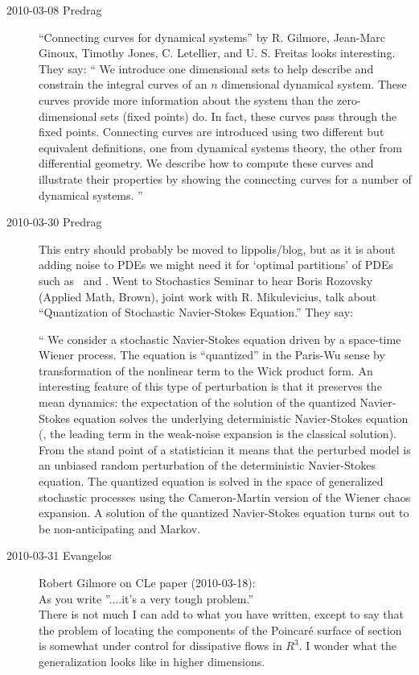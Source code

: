 \begin{description}
\item[2010-03-08 Predrag]
``Connecting curves for dynamical systems'' by
R. Gilmore, Jean-Marc Ginoux, Timothy Jones, C. Letellier, and U. S.
 Freitas looks interesting. They say:
``
 We introduce one dimensional sets to help describe and constrain the integral
curves of an $n$ dimensional dynamical system. These curves provide more
information about the system than the zero-dimensional sets (fixed points) do.
In fact, these curves pass through the fixed points. Connecting curves are
introduced using two different but equivalent definitions, one from dynamical
systems theory, the other from differential geometry. We describe how to
compute these curves and illustrate their properties by showing the connecting
curves for a number of dynamical systems.
''


\item[2010-03-30 Predrag] This entry should probably be moved
to lippolis/blog, but as it is about adding noise to PDEs we might need it for
`optimal partitions' of PDEs such as \KSe\ and \NSe.
Went to
Stochastics Seminar to hear
Boris Rozovsky (Applied Math, Brown), joint work with
R. Mikulevicius, talk about
``Quantization of Stochastic Navier-Stokes Equation.''
They say:

`` We consider a stochastic Navier-Stokes equation driven by a space-time
Wiener process. The equation is ``quantized'' in the Paris-Wu
sense by transformation of the
nonlinear term to the Wick product form. An interesting feature of
this type of perturbation is that it preserves the mean dynamics: the
expectation of the solution of the quantized Navier-Stokes equation
solves the underlying deterministic Navier-Stokes equation (\ie,
the leading term in the weak-noise expansion is the classical solution).
From the
stand point of a statistician it means that the perturbed model is
an unbiased random perturbation of the deterministic Navier-Stokes
equation. The quantized equation is solved in the space of generalized
stochastic processes using the Cameron-Martin version of the Wiener
chaos expansion. A solution of the quantized Navier-Stokes equation turns out
to be non-anticipating and Markov.

\item[2010-03-31 Evangelos] Robert Gilmore on CLe paper (2010-03-18):\\

As you write ''....it's a very tough problem.''\\

There is not much I can add to what you have written,
except to say that the problem of locating the components
of the Poincar\'e surface of section is somewhat
under control for dissipative flows in $R^3$.
I wonder what the generalization looks like in
higher dimensions.



\end{description}
